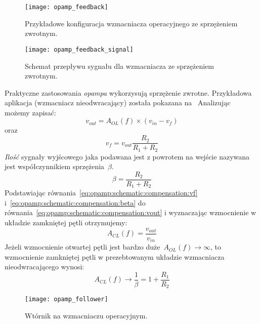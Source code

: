 \documentclass[twoside,pl,final]{labman}
\begin{document}
\begin{figure}[!htbp]
  \centering
  \texttt{[image: opamp\_feedback]}
  \caption{Przykładowe konfiguracja wzmacniacza operacyjnego ze sprzężeniem zwrotnym.}
  \label{fig:opamp:schematic:compensation:feedback}
\end{figure}
\begin{figure}[!htbp]
  \centering
  \texttt{[image: opamp\_feedback\_signal]}
  \caption{Schemat przepływu sygnału dla wzmacniacza ze sprzężeniem zwrotnym.}
  \label{fig:opamp:schematic:compensation:feedback:signal}
\end{figure}

Praktyczne zastosowania \emph{opampa} wykorzysują sprzężenie zwrotne.
Przykładowa aplikacja (wzmacniacz nieodwracający) została pokazana na~
Analizując~ możemy zapisać:
\begin{equation}
  v_{out} = A_{OL}(f) \times (v_{in} - v_{f})
  \label{eq:opamp:schematic:compensation:vout}
\end{equation}
oraz
\begin{equation}
  v_f = v_{out} \frac{R_2}{R_1 + R_2}
  \label{eq:opamp:schematic:compensation:vf}
\end{equation}
\emph{Ilość} sygnały wyjścowego jaka podawana jest z powrotem na wejście nazywana jest współczynnikiem sprzężenia~$\beta$.
\begin{equation}
  \beta = \frac{R_2}{R_1 + R_2}
  \label{eq:opamp:schematic:compensation:beta}
\end{equation}
Podstawiając równania~\ref{eq:opamp:schematic:compensation:vf} i~\ref{eq:opamp:schematic:compensation:beta}
do równania~\ref{eq:opamp:schematic:compensation:vout} i wyznaczając wzmocnienie w układzie zamkniętej pętli
otrzymujemy:
\begin{equation}
  A_{CL}(f) = \frac{v_{out}}{v_{in}}
  \label{eq:opamp:schematic:compensation:acl}
\end{equation}
Jeżeli wzmocnienie otwartej pętli jest bardzo duże~$A_{OL}(f) \rightarrow \infty$,
to wzmocnienie zamkniętej pętli w prezebtowanym układzie wzmacniacza nieodwracającego wynosi:
\begin{equation}
  A_{CL}(f) \rightarrow \frac{1}{\beta} = 1 + \frac{R_1}{R_2}
  \label{eq:opamp:schematic:compensation:acl:beta}
\end{equation}

\begin{figure}[!htbp]
  \centering
  \texttt{[image: opamp\_follower]}
  \caption{Wtórnik na wzmacniaczu operacyjnym.}
  \label{fig:opamp:schematic:compensation:follower}
\end{figure}
\end{document}
